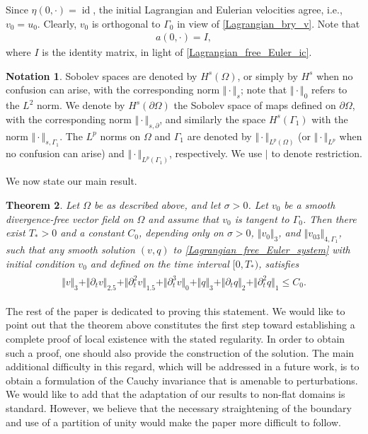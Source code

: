 \documentclass[10pt,reqno]{amsart}
\theoremstyle{plain}
\newtheorem{theorem}{Theorem}[section]
\theoremstyle{definition}
\newtheorem{notation}[theorem]{Notation}
\numberwithin{equation}{section}
\newcommand{\Ga}{\Gamma}
\newcommand{\si}{\sigma}
\newcommand{\Om}{\Omega}
\newcommand{\id}{\operatorname{id}}
\newcommand{\norm}[1]{\Vert#1\Vert}
\newcommand{\srest}{\mathord{|}}
\begin{document}
Since $\eta(0,\cdot) = \id$, 
the initial Lagrangian and Eulerian velocities agree, i.e., $v_0 = u_0$.
Clearly,
$v_0$ is orthogonal to $\Ga_0$ in view of \eqref{Lagrangian_bry_v}.
Note that
\begin{gather}
a(0,\cdot) = I, 
\nonumber
\end{gather}
where $I$ is the identity matrix, in light of \eqref{Lagrangian_free_Euler_ic}.

\begin{notation}
Sobolev spaces are denoted by 
$H^s(\Om)$, or simply by $H^s$ when no confusion can arise, with the corresponding
norm $\norm{\cdot}_s$; note that $\norm{\cdot}_0$ refers
to the $L^2$ norm. We denote by
$H^s(\partial \Om)$ the Sobolev space of maps defined on $\partial \Om$, with the corresponding
norm $\norm{\cdot}_{s,\partial}$, and similarly the space
$H^s( \Ga_1)$ with the norm  $\norm{\cdot}_{s,\Ga_1}$.
 The $L^p$ norms on $\Om$ and $\Ga_1$ are denoted by
$\norm{\cdot}_{L^p(\Om)}$ 
(or
$\norm{\cdot}_{L^p}$ when no confusion can arise)
and $\norm{\cdot}_{L^p(\Ga_1)}$, respectively.
We use $\srest$ to denote restriction.
\end{notation}

We now state our main result. 

\begin{theorem}
Let $\Om$ be as described above,
and let $\si >0$. 
Let $v_0$ be a smooth divergence-free vector field on $\Om$ and assume that 
$v_0$ is tangent to $\Ga_0$.
Then there exist $T_*>0$ 
and 
a constant $C_0$, depending only on $\si>0$, $\norm{v_0}_3$, 
and $\norm{v_{03}}_{4,\Ga_1}$, 
such that any smooth solution
$(v,q)$ to \eqref{Lagrangian_free_Euler_system} with initial condition
$v_0$ and defined on the time interval $[0,T_*)$, satisfies
\begin{align}
\begin{split}
\norm{v}_3 + \norm{\partial_t v}_{2.5} + \norm{\partial^2_t v}_{1.5}
+ \norm{\partial^3_t v}_0
+ \norm{q}_3 + \norm{\partial_t q}_{2} + \norm{\partial^2_t q}_1 \leq C_0.
\end{split}
   \label{EQ03}
\end{align}
\label{main_theorem}
\end{theorem}

The rest of the paper is dedicated to proving
this statement. We would like to point out that the theorem above
constitutes the first step toward establishing a complete proof of local
existence with the stated regularity. 
In order to obtain such a proof, one should also 
provide the construction of the solution. 
The main additional difficulty in this regard, which will be addressed 
in a future work, is to obtain a formulation of the Cauchy invariance
that is amenable to perturbations.
We would like to add that the adaptation of our results to non-flat
domains is standard. However, we believe that the
necessary straightening of the boundary and  use of a partition of
unity would make the paper more difficult to follow.
\end{document}
